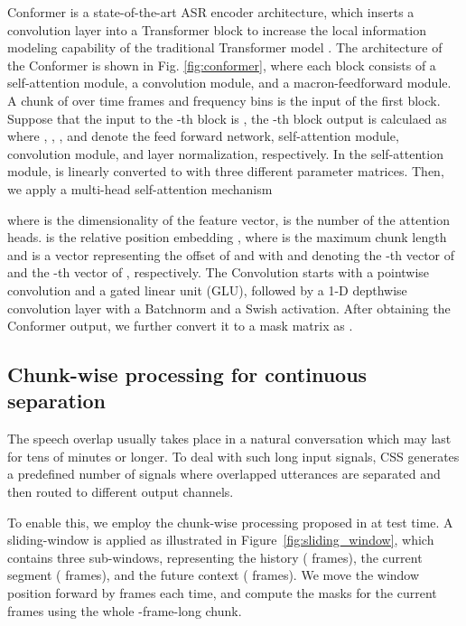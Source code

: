 \documentclass{article}
\begin{document}
	Conformer \cite{gulati2020conformer} is a state-of-the-art ASR encoder architecture, which inserts a convolution layer into a Transformer block  to increase the local information modeling capability of the traditional Transformer model \cite{vaswani2017attention}. The architecture of the Conformer is shown in Fig. \ref{fig:conformer}, where each block consists of a self-attention module, a convolution module, and a macron-feedforward module. A chunk of  over time frames and frequency bins is the input of the first block. Suppose that the input to the -th block is , the -th block output is calculaed as
	 where
	, , , and  denote the feed forward network, self-attention module, convolution module, and layer normalization, respectively. 
	In the self-attention module,  is linearly converted to  with three different parameter matrices. Then, we apply a multi-head self-attention mechanism
	
	 where   is the dimensionality of the feature vector,  is the number of the attention heads.  is the relative position embedding \cite{shaw2018self}, where  is the maximum chunk length and  is a vector representing the offset of  and  with  and  denoting the -th vector of  and the -th vector of , respectively.  
	The Convolution  starts with  a pointwise convolution and a gated linear unit (GLU), followed by a 1-D depthwise convolution layer with a Batchnorm \cite{ioffe2015batch} and a Swish activation. After obtaining the Conformer output, we further convert it to a mask matrix as .
	
	


	
	\subsection{Chunk-wise processing for continuous separation}
	\label{ssec:sliding-window}
	The speech overlap usually takes place in a natural conversation which may last for tens of minutes or longer. To deal with such long input signals, CSS generates a predefined number of signals where overlapped utterances are separated and then routed to different output channels. 
	
	
	To enable this, we employ the chunk-wise processing proposed in \cite{Yoshioka2018Unmix} at test time. 
	A sliding-window is applied as illustrated in Figure~\ref{fig:sliding_window}, which contains three sub-windows, representing the history ( frames), the current segment ( frames), and the future context ( frames).  
We move the window position forward by  frames each time, and compute the masks for the current  frames using the whole -frame-long chunk. 
\end{document}
